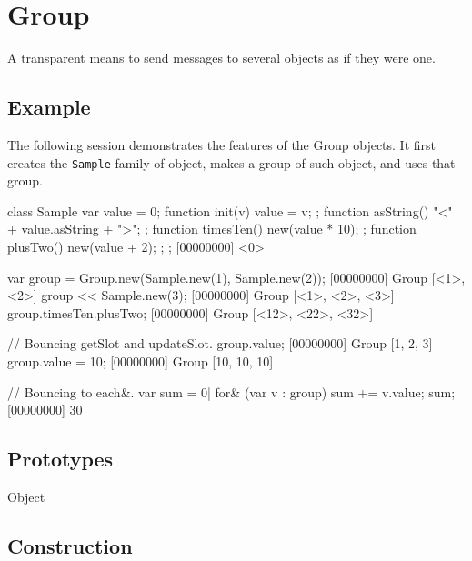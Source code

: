 
\section{Group}
A transparent means to send messages to several objects as if they
were one.

\subsection{Example}

The following session demonstrates the features of the Group
objects.  It first creates the \lstinline|Sample| family of object,
makes a group of such object, and uses that group.

\begin{urbiscript}[firstnumber=1]
class Sample
{
  var value = 0;
  function init(v) { value = v; };
  function asString() { "<" + value.asString + ">"; };
  function timesTen() { new(value * 10); };
  function plusTwo()  { new(value + 2); };
};
[00000000] <0>

var group = Group.new(Sample.new(1), Sample.new(2));
[00000000] Group [<1>, <2>]
group << Sample.new(3);
[00000000] Group [<1>, <2>, <3>]
group.timesTen.plusTwo;
[00000000] Group [<12>, <22>, <32>]

// Bouncing getSlot and updateSlot.
group.value;
[00000000] Group [1, 2, 3]
group.value = 10;
[00000000] Group [10, 10, 10]

// Bouncing to each&.
var sum = 0|
for& (var v : group)
  sum += v.value;
sum;
[00000000] 30
\end{urbiscript}

\subsection{Prototypes}

\begin{refObjects}
\item[Object]
\end{refObjects}

\subsection{Construction}

